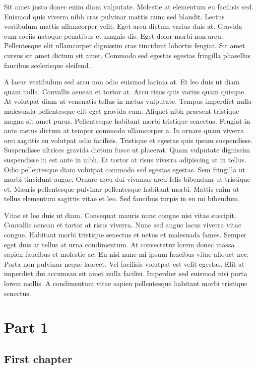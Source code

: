 \documentclass[epsf,a4paper]{book}
\begin{document}
Sit amet justo donec enim diam vulputate. Molestie at elementum eu facilisis sed. Euismod quis viverra nibh cras pulvinar mattis nunc sed blandit. Lectus vestibulum mattis ullamcorper velit. Eget arcu dictum varius duis at. Gravida cum sociis natoque penatibus et magnis dis. Eget dolor morbi non arcu. Pellentesque elit ullamcorper dignissim cras tincidunt lobortis feugiat. Sit amet cursus sit amet dictum sit amet. Commodo sed egestas egestas fringilla phasellus faucibus scelerisque eleifend.

A lacus vestibulum sed arcu non odio euismod lacinia at. Et leo duis ut diam quam nulla. Convallis aenean et tortor at. Arcu risus quis varius quam quisque. At volutpat diam ut venenatis tellus in metus vulputate. Tempus imperdiet nulla malesuada pellentesque elit eget gravida cum. Aliquet nibh praesent tristique magna sit amet purus. Pellentesque habitant morbi tristique senectus. Feugiat in ante metus dictum at tempor commodo ullamcorper a. In ornare quam viverra orci sagittis eu volutpat odio facilisis. Tristique et egestas quis ipsum suspendisse. Suspendisse ultrices gravida dictum fusce ut placerat. Quam vulputate dignissim suspendisse in est ante in nibh. Et tortor at risus viverra adipiscing at in tellus. Odio pellentesque diam volutpat commodo sed egestas egestas. Sem fringilla ut morbi tincidunt augue. Ornare arcu dui vivamus arcu felis bibendum ut tristique et. Mauris pellentesque pulvinar pellentesque habitant morbi. Mattis enim ut tellus elementum sagittis vitae et leo. Sed faucibus turpis in eu mi bibendum.

Vitae et leo duis ut diam. Consequat mauris nunc congue nisi vitae suscipit. Convallis aenean et tortor at risus viverra. Nunc sed augue lacus viverra vitae congue. Habitant morbi tristique senectus et netus et malesuada fames. Semper eget duis at tellus at urna condimentum. At consectetur lorem donec massa sapien faucibus et molestie ac. Eu nisl nunc mi ipsum faucibus vitae aliquet nec. Porta non pulvinar neque laoreet. Vel facilisis volutpat est velit egestas. Elit at imperdiet dui accumsan sit amet nulla facilisi. Imperdiet sed euismod nisi porta lorem mollis. A condimentum vitae sapien pellentesque habitant morbi tristique senectus.

\mainmatter{}

\part{Part 1}

\chapter{First chapter}
\end{document}
